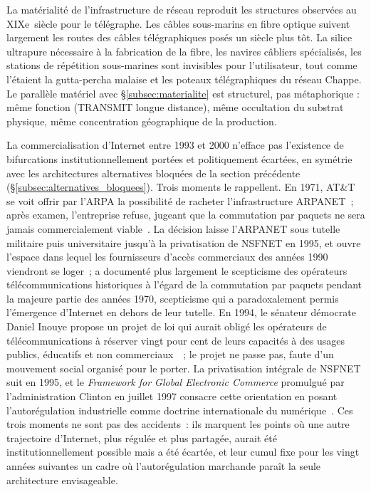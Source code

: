 La matérialité de l'infrastructure de réseau reproduit les structures observées au XIXe~siècle pour le télégraphe. Les câbles sous-marins en fibre optique suivent largement les routes des câbles télégraphiques posés un siècle plus tôt. La silice ultrapure nécessaire à la fabrication de la fibre, les navires câbliers spécialisés, les stations de répétition sous-marines sont invisibles pour l'utilisateur, tout comme l'étaient la gutta-percha malaise et les poteaux télégraphiques du réseau Chappe. Le parallèle matériel avec §\ref{subsec:materialite} est structurel, pas métaphorique : même fonction (TRANSMIT longue distance), même occultation du substrat physique, même concentration géographique de la production.

%
La commercialisation d'Internet entre 1993 et 2000 n'efface pas l'existence de bifurcations institutionnellement portées et politiquement écartées, en symétrie avec les architectures alternatives bloquées de la section précédente (§\ref{subsec:alternatives_bloquees}). Trois moments le rappellent. En 1971, AT\&T se voit offrir par l'ARPA la possibilité de racheter l'infrastructure ARPANET~; après examen, l'entreprise refuse, jugeant que la commutation par paquets ne sera jamais commercialement viable~\parencite{rose_att_2012, abbate_inventing_1999}. La décision laisse l'ARPANET sous tutelle militaire puis universitaire jusqu'à la privatisation de NSFNET en 1995, et ouvre l'espace dans lequel les fournisseurs d'accès commerciaux des années 1990 viendront se loger~; \textcite{russell_open_2014} a documenté plus largement le scepticisme des opérateurs télécommunications historiques à l'égard de la commutation par paquets pendant la majeure partie des années 1970, scepticisme qui a paradoxalement permis l'émergence d'Internet en dehors de leur tutelle. En 1994, le sénateur démocrate Daniel Inouye propose un projet de loi qui aurait obligé les opérateurs de télécommunications à réserver vingt pour cent de leurs capacités à des usages publics, éducatifs et non commerciaux~\parencite{tarnoff_internet_2022}~; le projet ne passe pas, faute d'un mouvement social organisé pour le porter. La privatisation intégrale de NSFNET suit en 1995, et le \emph{Framework for Global Electronic Commerce} promulgué par l'administration Clinton en juillet 1997 consacre cette orientation en posant l'autorégulation industrielle comme doctrine internationale du numérique~\parencite{clinton_framework_1997}. Ces trois moments ne sont pas des accidents~: ils marquent les points où une autre trajectoire d'Internet, plus régulée et plus partagée, aurait été institutionnellement possible mais a été écartée, et leur cumul fixe pour les vingt années suivantes un cadre où l'autorégulation marchande paraît la seule architecture envisageable.


